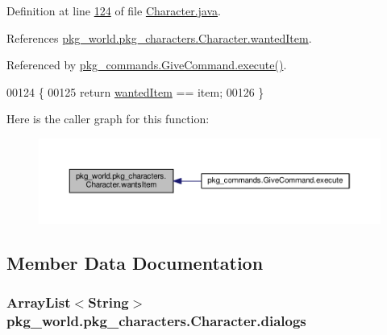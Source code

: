 Definition at line \hyperlink{Character_8java_source_l00124}{124} of file \hyperlink{Character_8java_source}{Character.\-java}.



References \hyperlink{Character_8java_source_l00035}{pkg\-\_\-world.\-pkg\-\_\-characters.\-Character.\-wanted\-Item}.



Referenced by \hyperlink{GiveCommand_8java_source_l00029}{pkg\-\_\-commands.\-Give\-Command.\-execute()}.


\begin{DoxyCode}
00124                                         \{
00125         \textcolor{keywordflow}{return} \hyperlink{classpkg__world_1_1pkg__characters_1_1Character_a3e5abf14759d18446163db9597d10a44}{wantedItem} == item;
00126     \}
\end{DoxyCode}


Here is the caller graph for this function\-:\nopagebreak
\begin{figure}[H]
\begin{center}
\leavevmode
\includegraphics[width=350pt]{classpkg__world_1_1pkg__characters_1_1Character_a816f8f79ef1e8c9635f0cdeb180b9f3f_icgraph}
\end{center}
\end{figure}




\subsection{Member Data Documentation}
\hypertarget{classpkg__world_1_1pkg__characters_1_1Character_a4747943f9a5d0f11605230df4d2559d2}{
\subsubsection[{dialogs}]{\setlength{\rightskip}{0pt plus 5cm}Array\-List$<$String$>$ pkg\-\_\-world.\-pkg\-\_\-characters.\-Character.\-dialogs\hspace{0.3cm}{\ttfamily [private]}}}\label{classpkg__world_1_1pkg__characters_1_1Character_a4747943f9a5d0f11605230df4d2559d2}


